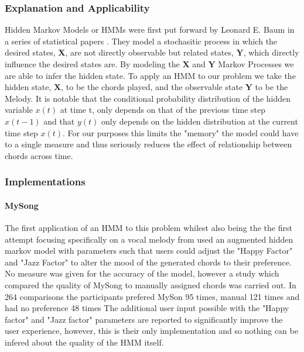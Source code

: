 \subsubsection{Explanation and Applicability}
Hidden Markov Models or HMMs were first put forward by Leonard E. Baum in a series of statistical papers \cite{HMM1} \cite{HMM2} \cite{HMM3}. 
They model a stochasitic process in which the desired states, $\boldsymbol{X}$, are not directly observable but related states, $\boldsymbol{Y}$, which directly influence the desired states are. 
By modeling the $\boldsymbol{X}$ and $\boldsymbol{Y}$ Markov Processes %
we are able to infer the hidden state.
To apply an HMM to our problem we take the hidden state, $\boldsymbol{X}$, to be the chords played, and the observable state $\boldsymbol{Y}$ to be the Melody.
It is notable that the conditional probability distribution of the hidden variable $x(t)$ at time t, only depends on that of the previous time step $x(t-1)$ and that $y(t)$ only depends on the hidden distribution at the current time step $x(t)$.
For our purposes this limits the "memory" the model could have to a single measure and thus seriously reduces the effect of relationship between chords across time.

\subsubsection{Implementations}

\paragraph{MySong} The first application of an HMM to this problem whilest also being the the first attempt focusing specifically on a vocal melody from \cite{MySong} used an augmented hidden markov model with parameters such that users could adjust the "Happy Factor" and "Jazz Factor" to alter the mood of the generated chords to their preference.
No measure was given for the accuracy of the model, however a study which compared the quality of MySong to manually assigned chords was carried out. 
In 264 comparisons the participants prefered MySon 95 times, manual 121 times and had no preference 48 times
The additional user input possible with the "Happy factor" and "Jazz factor" parameters are reported to significantly improve the user experience, however, this is their only implementation and so nothing can be infered about the quality of the HMM itself.

